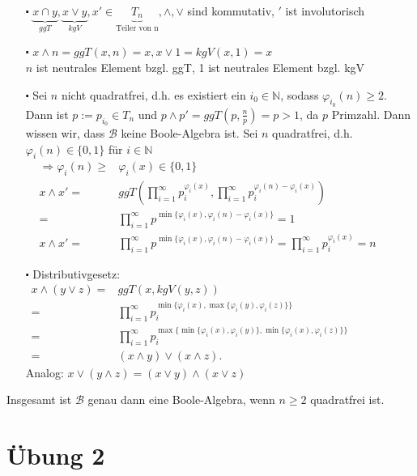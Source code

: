 \documentclass[10pt, a4paper]{article}
\begin{document}
\begin{itemize}
	\item[$\centerdot$] $\underbrace{x\cap y}_{ggT}, \underbrace{x\vee y}_{kgV}, x'\in \underbrace{T_{n}}_{\text{Teiler von n}}, \wedge,\vee$ sind kommutativ, $'$ ist involutorisch
	\item[$\centerdot$] $x\wedge n = ggT(x,n)=x, x\vee1=kgV(x,1)=x$	\\
	$n$ ist neutrales Element bzgl. ggT, 1 ist neutrales Element bzgl. kgV
	\item[$\centerdot$] Sei $n$ nicht quadratfrei, d.h. es existiert ein $i_{0}\in\mathbb{N}$, sodass $\varphi_{i_{0}}(n)\geq2$. Dann ist $p:=p_{i_{0}}\in T_{n}$ und $p\wedge p'=ggT(p,\frac{n}{p})=p>1$, da $p$ Primzahl. Dann wissen wir, dass $\mathcal{B}$ keine Boole-Algebra ist.
	Sei $n$ quadratfrei, d.h. $\varphi_{i}(n)\in\{0,1\}$ für $i\in\mathbb{N}$
	\begin{align*}
		\Rightarrow\varphi_{i}(n)\geq&\varphi_{i}(x)\in\{0,1\}	\hspace{3in}\\
		x\wedge x' =&ggT\left(\prod_{i=1}^{\infty}p_{i}^{\varphi_{i}(x)}, \prod_{i=1}^{\infty}p_{i}^{\varphi_{i}(n)-\varphi_{i}(x)}\right)	\\
		=&\prod_{i=1}^{\infty}p^{\min\{\varphi_{i}(x),\varphi_{i}(n)-\varphi_{i}(x)\}}=1	\\
		x\wedge x' =&\prod_{i=1}^{\infty}p^{\min\{\varphi_{i}(x),\varphi_{i}(n)-\varphi_{i}(x)\}}=\prod_{i=1}^{\infty}p_{i}^{\varphi_{i}(x)}=n
	\end{align*}
	\item[$\centerdot$] Distributivgesetz:
	\begin{align*}
		x\wedge(y\vee z)=&ggT(x, kgV(y,z))	\hspace{200pt}\\
		=&\prod_{i=1}^{\infty}p_{i}^{\min\{\varphi_{i}(x),\max\{\varphi_{i}(y),\varphi_{i}(z)\}\}}	\\
		=&\prod_{i=1}^{\infty}p_{i}^{\max\{\min\{\varphi_{i}(x),\varphi_{i}(y)\},\min\{\varphi_{i}(x),\varphi_{i}(z)\}\}}	\\
		=& (x\wedge y)\vee(x\wedge z).
	\end{align*}
	Analog: $x\vee(y\wedge z)=(x\vee y)\wedge(x\vee z)$	
\end{itemize}
Insgesamt ist $\mathcal{B}$ genau dann eine Boole-Algebra, wenn $n\geq2$ quadratfrei ist.

\section{Übung 2}
\end{document}
